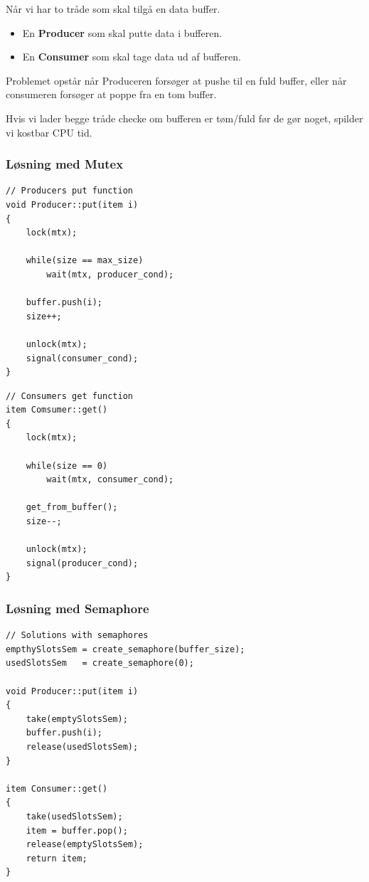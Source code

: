 Når vi har to tråde som skal tilgå en data buffer.

\begin{itemize}
	\item En \textbf{Producer} som skal putte data i bufferen.
	\item En \textbf{Consumer} som skal tage data ud af bufferen.
\end{itemize}

Problemet opstår når Produceren forsøger at pushe til en fuld buffer, eller når consumeren forsøger at poppe fra en tom buffer.

Hvis vi lader begge tråde checke om bufferen er tøm/fuld før de gør noget, spilder vi kostbar CPU tid.

\subsubsection{Løsning med Mutex}

\begin{lstlisting}[otherkeywords={item, buffer, unlock, lock, signal}]
// Producers put function
void Producer::put(item i)
{
	lock(mtx);
	
	while(size == max_size)
		wait(mtx, producer_cond);
		
	buffer.push(i);
	size++;
	
	unlock(mtx);
	signal(consumer_cond);
}
\end{lstlisting}

\begin{lstlisting}
// Consumers get function
item Comsumer::get()
{
	lock(mtx);
	
	while(size == 0)
		wait(mtx, consumer_cond);
		
	get_from_buffer();
	size--;
	
	unlock(mtx);
	signal(producer_cond);
}
\end{lstlisting}

\subsubsection{Løsning med Semaphore}
\begin{lstlisting}[otherkeywords={create_semaphore, take, push, release, item}]
// Solutions with semaphores
empthySlotsSem = create_semaphore(buffer_size);
usedSlotsSem   = create_semaphore(0);

void Producer::put(item i)
{
	take(emptySlotsSem);
	buffer.push(i);
	release(usedSlotsSem);
}

item Consumer::get()
{
	take(usedSlotsSem);
	item = buffer.pop();
	release(emptySlotsSem);
	return item;
}
\end{lstlisting}

